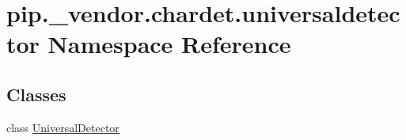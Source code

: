 \hypertarget{namespacepip_1_1__vendor_1_1chardet_1_1universaldetector}{}\section{pip.\+\_\+vendor.\+chardet.\+universaldetector Namespace Reference}
\label{namespacepip_1_1__vendor_1_1chardet_1_1universaldetector}
\subsection*{Classes}
\begin{DoxyCompactItemize}
\item 
class \hyperlink{classpip_1_1__vendor_1_1chardet_1_1universaldetector_1_1UniversalDetector}{Universal\+Detector}
\end{DoxyCompactItemize}
